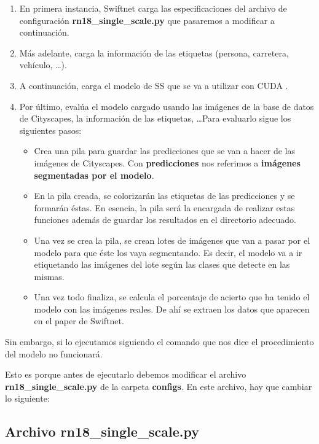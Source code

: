 \begin{enumerate}
\item En primera instancia, Swiftnet carga las especificaciones del archivo de configuración \textbf{rn18\_single\_scale.py} que pasaremos a modificar a continuación.
\item Más adelante, carga la información de las etiquetas (persona, carretera, vehículo, \ldots).
\item A continuación, carga el modelo de \ac{SS} que se va a utilizar con CUDA \cite{cuda}.
\item Por último, evalúa el modelo cargado usando las imágenes de la base de datos de Cityscapes, la información de las etiquetas, \ldots Para evaluarlo sigue los siguientes pasos:

\begin{itemize}
\item Crea una pila para guardar las predicciones que se van a hacer de las imágenes de Cityscapes. Con \textbf{predicciones} nos referimos a \textbf{imágenes segmentadas por el modelo}.
\item En la pila creada, se colorizarán las etiquetas de las predicciones y se formarán éstas. En esencia, la pila será la encargada de realizar estas funciones además de guardar los resultados en el directorio adecuado.
\item Una vez se crea la pila, se crean lotes de imágenes que van a pasar por el modelo para que éste los vaya segmentando. Es decir, el modelo va a ir etiquetando las imágenes del lote según las clases que detecte en las mismas.
\item Una vez todo finaliza, se calcula el porcentaje de acierto que ha tenido el modelo con las imágenes reales. De ahí se extraen los datos que aparecen en el paper de Swiftnet.
\end{itemize}   
\end{enumerate}
Sin embargo, si lo ejecutamos siguiendo el comando que nos dice el procedimiento del modelo no funcionará.

Esto es porque antes de ejecutarlo debemos modificar el archivo \textbf{rn18\_single\_scale.py} de la carpeta \textbf{configs}. En este archivo, hay que cambiar lo siguiente:

\subsection{Archivo rn18\_single\_scale.py}

